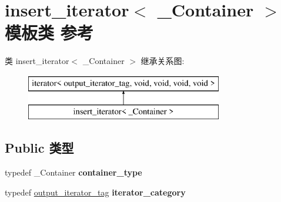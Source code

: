 \hypertarget{classinsert__iterator}{}\section{insert\+\_\+iterator$<$ \+\_\+\+Container $>$ 模板类 参考}
\label{classinsert__iterator}
类 insert\+\_\+iterator$<$ \+\_\+\+Container $>$ 继承关系图\+:\begin{figure}[H]
\begin{center}
\leavevmode
\includegraphics[height=2.000000cm]{classinsert__iterator}
\end{center}
\end{figure}
\subsection*{Public 类型}
\begin{DoxyCompactItemize}
\item 
\mbox{\label{classinsert__iterator_ac3b6d00492ec1b550f24f701c15a2ff5}} 
typedef \+\_\+\+Container {\bfseries container\+\_\+type}
\item 
\mbox{\label{classinsert__iterator_a3682b2fc4c0a25a9d3a3f900d7db9388}} 
typedef \hyperlink{structoutput__iterator__tag}{output\+\_\+iterator\+\_\+tag} {\bfseries iterator\+\_\+category}
\end{DoxyCompactItemize}
